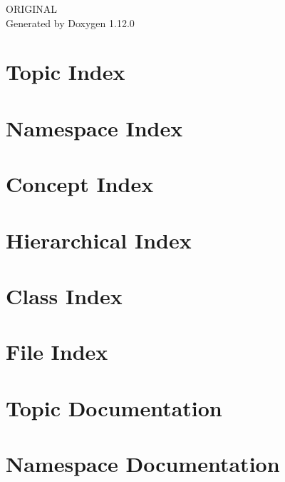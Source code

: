 \documentclass[twoside]{book}
\newcommand{\+}{\discretionary{\mbox{\scriptsize$\hookleftarrow$}}{}{}}
\newcommand{\clearemptydoublepage}{%
    \newpage{\pagestyle{empty}\cleardoublepage}%
  }
\begin{document}
  \raggedbottom
    \hypersetup{pageanchor=false,
                bookmarksnumbered=true,
                pdfencoding=unicode
               }
  \begin{titlepage}
  \vspace*{7cm}
  \begin{center}%
  {\Large ORIGINAL}\\
  \vspace*{1cm}
  {\large Generated by Doxygen 1.12.0}\\
  \end{center}
  \end{titlepage}
  \clearemptydoublepage
  \tableofcontents
  \clearemptydoublepage
  \hypersetup{pageanchor=true}

\chapter{Topic Index}

\chapter{Namespace Index}

\chapter{Concept Index}

\chapter{Hierarchical Index}

\chapter{Class Index}

\chapter{File Index}

\chapter{Topic Documentation}





\chapter{Namespace Documentation}


\end{document}
